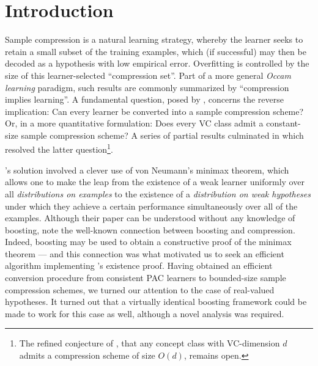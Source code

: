 
\chapter{Introduction}
    
\label{sec:intro}

\begin{sloppypar}
Sample compression 
is a natural learning strategy,
whereby
the learner
seeks to retain a small subset of the training examples,
which (if successful)
may then be decoded as
a hypothesis with low empirical error.
Overfitting is controlled by the size of this
learner-selected
``compression set''.
Part of a
more general
{\em Occam learning} paradigm,
such results are commonly summarized by ``compression implies learning''.
A fundamental question,
posed by \citet{Littlestone86relatingdata},
concerns the reverse implication:
Can every learner be converted into a sample compression scheme?
Or, in a more quantitative formulation:
Does every VC class admit a constant-size
sample compression scheme?
A series of partial results
\citep{floyd1989space,helmbold1992learning,DBLP:journals/ml/FloydW95,ben1998combinatorial,DBLP:journals/jmlr/KuzminW07,DBLP:journals/jcss/RubinsteinBR09,DBLP:journals/jmlr/RubinsteinR12,MR3047077,livni2013honest,moran2017teaching}
culminated in \citet{DBLP:journals/jacm/MoranY16}
which resolved the latter question\footnote{
  The refined conjecture of \citet{Littlestone86relatingdata}, that any concept class with VC-dimension $d$
  admits a compression scheme of size $O(d)$, remains open.}.
\end{sloppypar}

\citeauthor{DBLP:journals/jacm/MoranY16}'s
solution involved a clever use of von Neumann's minimax theorem,
which allows one to
make the leap
from
the existence of a weak learner uniformly over all {\em distributions on examples}
to
the existence of a {\em distribution on weak hypotheses} under which they achieve
a certain performance simultaneously over all of the examples.
Although their paper can be understood without any knowledge of boosting,
\citeauthor{DBLP:journals/jacm/MoranY16} note the well-known connection between boosting
and compression. Indeed, boosting may be used to obtain a constructive proof
of the minimax theorem
\citep{freund1996game,MR1729311}
--- 
and this connection was what motivated us to
seek an efficient algorithm implementing
\citeauthor{DBLP:journals/jacm/MoranY16}'s
existence proof.
Having obtained an efficient conversion procedure
from consistent PAC learners to bounded-size sample
compression schemes, we turned our attention to the case of real-valued hypotheses.
It turned out that a virtually identical boosting framework
could be made to work for this case as well, although a novel analysis was required.
    

